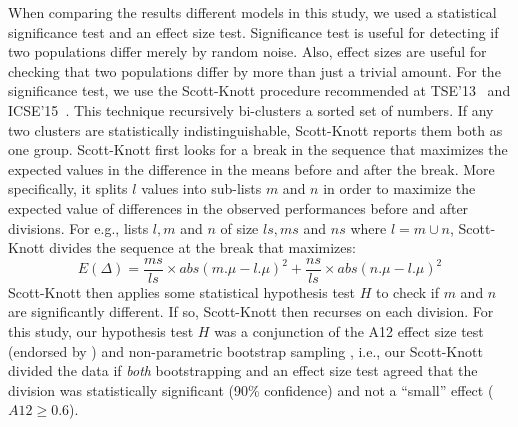 \documentclass[10pt,journal,compsoc]{IEEEtran}
\begin{document}
When comparing the results different models in this study, we used a statistical significance test and an effect size test. Significance test is useful for detecting if two populations
differ merely by random noise. Also, effect sizes are useful for checking that two populations differ by more than just a trivial amount. For the significance test,  we use the Scott-Knott procedure  recommended at TSE'13~\cite{mittas2013ranking} and ICSE'15~\cite{ghotra2015revisiting}. This technique recursively bi-clusters a sorted set of numbers. If any two clusters are statistically indistinguishable, Scott-Knott reports them both as one group. Scott-Knott first looks for a break in the sequence that maximizes the expected values in the difference in the means before and after the break. More specifically,  it  splits $l$ values into sub-lists $m$ and $n$ in order to maximize the expected value of differences  in the observed performances before and after divisions. For e.g., lists $l,m$ and $n$ of size $ls,ms$ and $ns$ where $l=m\cup n$, Scott-Knott divides the sequence at the break that maximizes:
\begin{equation}
    E(\Delta)=\frac{ms}{ls}\times abs(m.\mu - l.\mu)^2  + \frac{ns}{ls}\times abs(n.\mu - l.\mu)^2
\end{equation}
Scott-Knott then applies some statistical hypothesis test $H$ to check if $m$ and $n$ are significantly different. If so, Scott-Knott then recurses on each division. For this study, our hypothesis test $H$ was a conjunction of the A12 effect size test (endorsed by \cite{arcuri2011practical})  and non-parametric bootstrap sampling \cite{efron94}, i.e., our Scott-Knott divided the data if {\em both} bootstrapping and an effect size test agreed that the division was statistically significant (90\% confidence) and not a ``small'' effect ($A12 \ge 0.6$).




\end{document}
